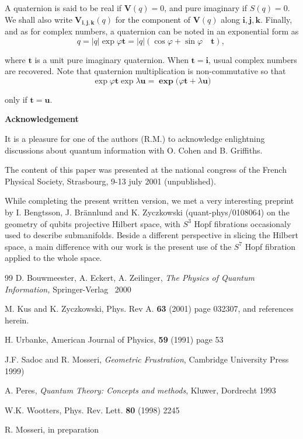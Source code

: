 \documentclass{amsart}
\begin{document}
A quaternion is said to be real if $\mathbf{V}(q)=0$, and pure imaginary if
$S(q)=0$. We shall also write$\;\mathbf{V}_{\mathbf{i},\mathbf{j},\mathbf{k}%
}(q)$ for the component of $\mathbf{V}(q)$ along $\mathbf{i},\mathbf{j}%
,\mathbf{k.}$ Finally, and as for complex numbers, a quaternion can be noted
in an exponential form as%
\[
q=\left|  q\right|  \exp\varphi\mathbf{t=}\left|  q\right|  \left(
\cos\varphi+\sin\varphi\quad\mathbf{t}\right)  \text{, }%
\]

where $\mathbf{t}$ is a unit pure imaginary quaternion. When $\mathbf{t}%
=\mathbf{i}$, usual complex numbers are recovered. Note that quaternion
multiplication is non-commutative so that%
\[
\exp\varphi\mathbf{t}\exp\lambda\mathbf{u=\exp(}\varphi\mathbf{t+}%
\lambda\mathbf{u)}%
\]

only if $\mathbf{t=u}$.

\bigskip

\textbf{Acknowledgement}

It is a pleasure for one of the authors (R.M.) to acknowledge enlightning
discussions about quantum information with O. Cohen and B. Griffiths.

The content of this paper was presented at the national congress of the French
Physical Society, Strasbourg, 9-13 july 2001 (unpublished).

While completing the present written version, we met a very interesting
preprint by I. Bengtsson, J. Br\"{a}nnlund and K. Zyczkowski
(quant-phys/0108064) on the geometry of qubits projective Hilbert space, with
$S^{3}$ Hopf fibrations occasionaly used to describe submanifolds. Beside a
different perspective in slicing the Hilbert space, a main difference with our
work is the present use of the $S^{7}$ Hopf fibration applied to the whole space.

\begin{thebibliography}{99}
D. Bouwmeester, A. Eckert, A. Zeilinger, \textit{The
Physics of Quantum Information, }Springer-Verlag \ 2000

M. Kus and K. Zyczkowski, Phys. Rev A. \textbf{63}
(2001) page 032307, and references herein.

H. Urbanke, American Journal of Physics, \textbf{59} (1991)
page 53

J.F. Sadoc and R. Mosseri, \textit{Geometric
Frustration}, Cambridge University Press 1999)

A. Peres, \textit{Quantum Theory: Concepts and methods},
Kluwer, Dordrecht 1993

W.K. Wootters, Phys. Rev. Lett. \textbf{80} (1998) 2245

R. Mosseri, in preparation
\end{thebibliography}
\end{document}

